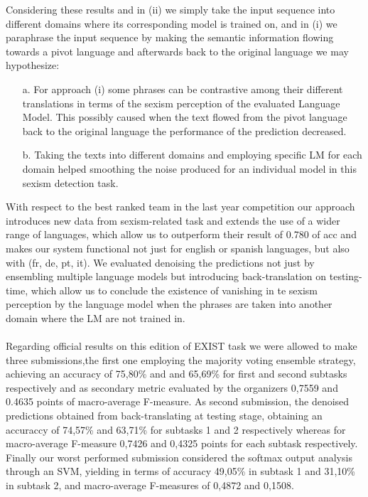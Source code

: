\documentclass[
]{ceurart}
\begin{document}
	Considering these results and in (ii) we simply take the input sequence into different
	domains where its corresponding model is trained on, and in (i) we paraphrase the input sequence by making the semantic information flowing towards a pivot language and afterwards back to the original language we may hypothesize:
	\begin{itemize}
			\item[a.] For approach (i) some phrases can be contrastive among their different translations in terms of the sexism perception of the evaluated Language Model. This possibly caused when the text flowed from the pivot language back to the original language the performance of the prediction decreased.
			\item [b.] Taking the texts into different domains and employing specific LM for each domain helped smoothing the noise produced for an individual model in this sexism detection task.
	\end{itemize} 
With respect to the best ranked team in the last year competition our approach
introduces new data from sexism-related task and extends the use of a wider range of
languages, which allow us to outperform their result of 0.780 of acc and makes our system functional not just for english or spanish languages, but also with (fr, de, pt, it). We evaluated denoising the predictions not just by ensembling multiple language models but introducing back-translation on testing-time, which allow us to conclude the existence of vanishing in te sexism perception by the language model when the phrases are taken into another domain where the LM are not trained in.
\\\\
Regarding official results on this edition of EXIST task we were allowed to make three submissions,the first one employing the majority voting ensemble strategy, achieving  an accuracy of 75,80\% and and  65,69\% for first and second subtasks respectively and as secondary metric evaluated by the organizers 0,7559	and 0.4635 points of  macro-average F-measure. As second submission, the denoised predictions obtained from back-translating at testing stage, obtaining an accuraccy of 74,57\% and 63,71\% for subtasks 1 and 2 respectively whereas for macro-average F-measure 0,7426 and 0,4325 points for each subtask respectively. Finally our worst performed submission considered the softmax output analysis through an SVM, yielding in terms of accuracy 49,05\% in subtask 1 and 31,10\% in subtask 2, and  macro-average F-measures of  0,4872 and 0,1508.
\end{document}
